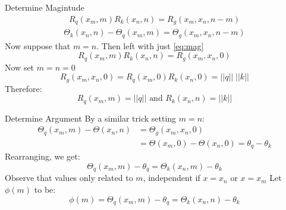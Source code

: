 \documentclass{beamer}
\begin{document}
\begin{frame}[t]{Determine Magintude}
    \vspace{-3em}
    \begin{gather}\label{eq:mag}
        R_q(x_m, m) R_k(x_n, n) = R_g(x_m, x_n, n - m)
    \end{gather}
    \vspace{-3em}
    \begin{gather}\label{eq:arg}
        \Theta_k(x_n, n) - \Theta_q(x_m, m) = \Theta_g(x_m, x_n, n - m)
    \end{gather}
    Now suppose that $m = n$. Then left with just \ref{eq:mag} \newline
    \[R_q(x_m, m) R_k(x_n, n) = R_g(x_m, x_n, 0)\]
    Now set $m = n = 0$
    \[R_g(x_m, x_n, 0) = R_q(x_m, 0) R_k(x_n, 0) = ||q|| \; ||k ||\]
    Therefore:
    \[R_q(x_m, m) = ||q|| \text{ and } R_k(x_n, n) = || k ||\]
\end{frame}

\begin{frame}[t]{Determine Argument}
    By a similar trick setting $m=n$:
    \begin{align}
        \Theta_q(x_m, m) - \Theta(x_n, n) &= \Theta_g(x_m, x_n, 0)\\
        &= \Theta(x_m, 0) - \Theta(x_n, 0) = \theta_q - \theta_k
    \end{align}
    Rearranging, we get:
    \[\Theta_q(x_m, m) - \theta_q = \Theta_k(x_n, m) - \theta_k\]
    Observe that values only related to $m$, independent if $x = x_n$ or $x = x_m$ \newline
    Let $\phi(m)$ to be:
    \[\phi(m) = \Theta_q(x_m, m) - \theta_q = \Theta_k(x_n, n) - \theta_k\]
\end{frame}
\end{document}

